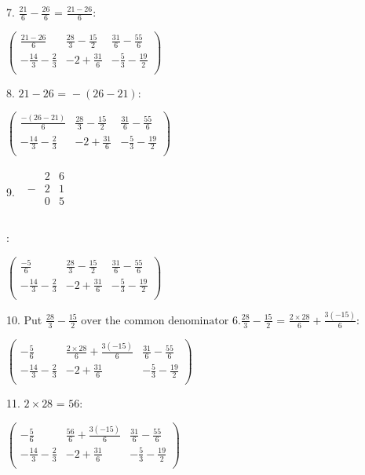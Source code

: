 \documentclass{article}
\begin{document}
7. $\frac{21}{6}-\frac{26}{6}\text{ = }\frac{21-26}{6}$:

$\left(
\begin{array}{ccc}
\frac{21-26}{6} & \frac{28}{3}-\frac{15}{2} & \frac{31}{6}-\frac{55}{6} \\
 -\frac{14}{3}-\frac{2}{3} & -2+\frac{31}{6} & -\frac{5}{3}-\frac{19}{2} \\
\end{array}
\right)$

8. $21-26\text{ = }-(26-21):$

$\left(
\begin{array}{ccc}
\frac{-(26-21)}{6} & \frac{28}{3}-\frac{15}{2} & \frac{31}{6}-\frac{55}{6} \\
 -\frac{14}{3}-\frac{2}{3} & -2+\frac{31}{6} & -\frac{5}{3}-\frac{19}{2} \\
\end{array}
\right)$

9. $\begin{array}{c}
\begin{array}{ccc}
\text{ }& 2 & 6 \\
 - & 2 & 1 \\
\hline
\text{  }& 0 & 5 \\
\end{array}
 \\
\end{array}$

:

$\left(
\begin{array}{ccc}
\frac{-5}{6} & \frac{28}{3}-\frac{15}{2} & \frac{31}{6}-\frac{55}{6} \\
 -\frac{14}{3}-\frac{2}{3} & -2+\frac{31}{6} & -\frac{5}{3}-\frac{19}{2} \\
\end{array}
\right)$

10. Put $\frac{28}{3}-\frac{15}{2}\text{ over the common denominator }6. \frac{28}{3}-\frac{15}{2}\text{ = }\frac{2\times 28}{6}+\frac{3 (-15)}{6}$:

$\left(
\begin{array}{ccc}
-\frac{5}{6} & \frac{2\times 28}{6}+\frac{3 (-15)}{6} & \frac{31}{6}-\frac{55}{6} \\
 -\frac{14}{3}-\frac{2}{3} & -2+\frac{31}{6} & -\frac{5}{3}-\frac{19}{2} \\
\end{array}
\right)$

11. $2\times 28\text{ = }56:$

$\left(
\begin{array}{ccc}
-\frac{5}{6} & \frac{56}{6}+\frac{3 (-15)}{6} & \frac{31}{6}-\frac{55}{6} \\
 -\frac{14}{3}-\frac{2}{3} & -2+\frac{31}{6} & -\frac{5}{3}-\frac{19}{2} \\
\end{array}
\right)$
\end{document}
